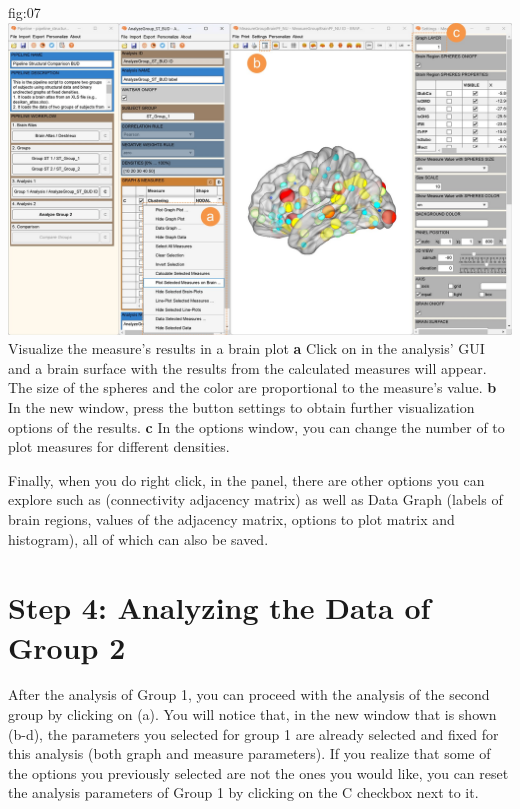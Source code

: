 \documentclass[justified]{tufte-handout}
\begin{document}
	{fig:07}
	{
	\includegraphics{fig07.jpg}
	}
	{Visualize the measure's results in a brain plot}
	{
	{\bf a} Click on  in the analysis' GUI and a brain surface with the results from the calculated measures will appear. The size of the spheres and the color are proportional to the measure's value.   
    {\bf b} In the new window, press the button settings to obtain further visualization options of the results. 
    {\bf c} In the options window, you can change the number 
    of  to plot measures for different densities.
	}
 
 Finally, when you do right click, in the  panel, there are other options you can explore such as  (connectivity adjacency matrix) as well as Data Graph (labels of brain regions, values of the adjacency matrix, options to plot matrix and histogram), all of which can also be saved.
  
\section{Step 4: Analyzing the Data of Group 2}

After the analysis of Group 1, you can proceed with the analysis of the second group by clicking on  (a). You will notice that, in the new window that is shown (b-d), the parameters you selected for group 1 are already selected and fixed for this analysis (both graph and measure parameters). If you realize that some of the options you previously selected are not the ones you would like, you can reset the analysis parameters of Group 1 by clicking on the C checkbox next to it.
\end{document}
